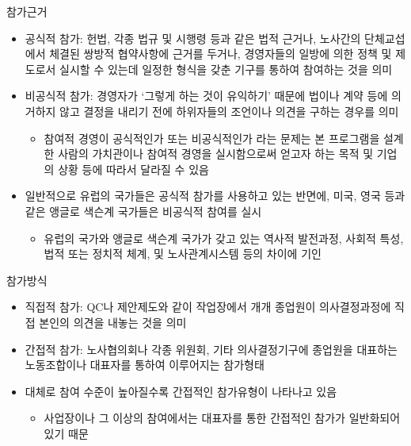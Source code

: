 \documentclass[aspectratio=169,xcolor=dvipsnames,handout]{beamer}
\begin{document}
\begin{frame}[allowframebreaks]{참가근거}
    \begin{itemize}[<+->]
        \item 공식적 참가: 헌법, 각종 법규 및 시행령 등과 같은 법적 근거나, 노사간의 단체교섭에서 체결된 쌍방적 협약사항에 근거를 두거나, 경영자들의 일방에 의한 정책 및 제도로서 실시할 수 있는데 일정한 형식을 갖춘 기구를 통하여 참여하는 것을 의미
        \item 비공식적 참가: 경영자가 `그렇게 하는 것이 유익하기' 때문에 법이나 계약 등에 의거하지 않고 결정을 내리기 전에 하위자들의 조언이나 의견을 구하는 경우를 의미
        \begin{itemize}[<+->]
            \item 참여적 경영이 공식적인가 또는 비공식적인가 라는 문제는 본 프로그램을 설계한 사람의 가치관이나 참여적 경영을 실시함으로써 얻고자 하는 목적 및 기업의 상황 등에 따라서 달라질 수 있음
        \end{itemize}
        \item 일반적으로 유럽의 국가들은 공식적 참가를 사용하고 있는 반면에, 미국, 영국 등과 같은 앵글로 색슨계 국가들은 비공식적 참여를 실시
        \begin{itemize}[<+->]
            \item 유럽의 국가와 앵글로 색슨계 국가가 갖고 있는 역사적 발전과정, 사회적 특성, 법적 또는 정치적 체계, 및 노사관계시스템 등의 차이에 기인
        \end{itemize}
    \end{itemize}
\end{frame}

\begin{frame}{참가방식}
    \begin{itemize}[<+->]
        \item 직접적 참가: QC나 제안제도와 같이 작업장에서 개개 종업원이 의사결정과정에 직접 본인의 의견을 내놓는 것을 의미
        \item 간접적 참가: 노사협의회나 각종 위원회, 기타 의사결정기구에 종업원을 대표하는 노동조합이나 대표자를 통하여 이루어지는 참가형태
        \item 대체로 참여 수준이 높아질수록 간접적인 참가유형이 나타나고 있음
        \begin{itemize}[<+->]
            \item 사업장이나 그 이상의 참여에서는 대표자를 통한 간접적인 참가가 일반화되어 있기 때문
        \end{itemize}
    \end{itemize}
\end{frame}
\end{document}
